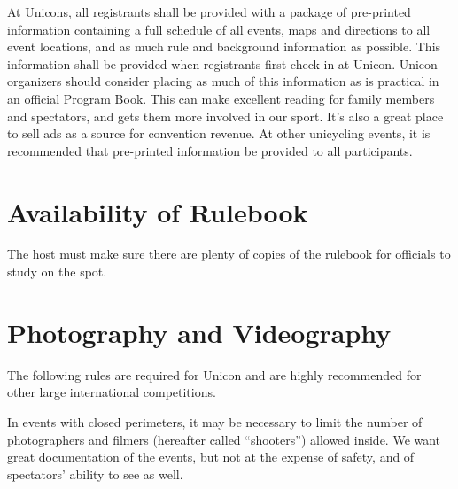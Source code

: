 At Unicons, all registrants shall be provided with a package of pre-printed information containing a full schedule of all events, maps and directions to all event locations, and as much rule and background information as possible.
This information shall be provided when registrants first check in at Unicon.
Unicon organizers should consider placing as much of this information as is practical in an official Program Book.
This can make excellent reading for family members and spectators, and gets them more involved in our sport.
It's also a great place to sell ads as a source for convention revenue.
At other unicycling events, it is recommended that pre-printed information be provided to all participants.

\section{Availability of Rulebook}
The host must make sure there are plenty of copies of the rulebook for officials to study on the spot.

\section{Photography and Videography}
The following rules are required for Unicon and are highly recommended for other large international competitions.

In events with closed perimeters, it may be necessary to limit the number of photographers and filmers (hereafter called ``shooters'') allowed inside.
We want great documentation of the events, but not at the expense of safety, and of spectators' ability to see as well.

